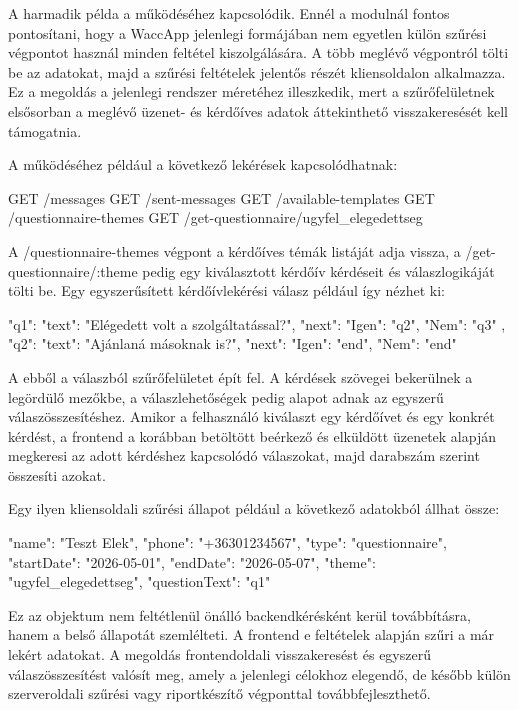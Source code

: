 A harmadik példa a  működéséhez kapcsolódik. Ennél a modulnál fontos pontosítani, hogy a WaccApp jelenlegi formájában nem egyetlen külön szűrési végpontot használ minden feltétel kiszolgálására. A  több meglévő végpontról tölti be az adatokat, majd a szűrési feltételek jelentős részét kliensoldalon alkalmazza. Ez a megoldás a jelenlegi rendszer méretéhez illeszkedik, mert a szűrőfelületnek elsősorban a meglévő üzenet- és kérdőíves adatok áttekinthető visszakeresését kell támogatnia.

A  működéséhez például a következő lekérések kapcsolódhatnak:

\begin{CodeBlock}
GET /messages
GET /sent-messages
GET /available-templates
GET /questionnaire-themes
GET /get-questionnaire/ugyfel_elegedettseg
\end{CodeBlock}

A /questionnaire-themes végpont a kérdőíves témák listáját adja vissza, a /get-questionnaire/:theme pedig egy kiválasztott kérdőív kérdéseit és válaszlogikáját tölti be. Egy egyszerűsített kérdőívlekérési válasz például így nézhet ki:

\begin{CodeBlock}
{
  "q1": {
    "text": "Elégedett volt a szolgáltatással?",
    "next": {
      "Igen": "q2",
      "Nem": "q3"
    }
  },
  "q2": {
    "text": "Ajánlaná másoknak is?",
    "next": {
      "Igen": "end",
      "Nem": "end"
    }
  }
}
\end{CodeBlock}

A  ebből a válaszból szűrőfelületet épít fel. A kérdések szövegei bekerülnek a legördülő mezőkbe, a válaszlehetőségek pedig alapot adnak az egyszerű válaszösszesítéshez. Amikor a felhasználó kiválaszt egy kérdőívet és egy konkrét kérdést, a frontend a korábban betöltött beérkező és elküldött üzenetek alapján megkeresi az adott kérdéshez kapcsolódó válaszokat, majd darabszám szerint összesíti azokat.

Egy ilyen kliensoldali szűrési állapot például a következő adatokból állhat össze:

\begin{CodeBlock}
{
  "name": "Teszt Elek",
  "phone": "+36301234567",
  "type": "questionnaire",
  "startDate": "2026-05-01",
  "endDate": "2026-05-07",
  "theme": "ugyfel_elegedettseg",
  "questionText": "q1"
}
\end{CodeBlock}

Ez az objektum nem feltétlenül önálló backendkérésként kerül továbbításra, hanem a  belső állapotát szemlélteti. A frontend e feltételek alapján szűri a már lekért adatokat. A megoldás frontendoldali visszakeresést és egyszerű válaszösszesítést valósít meg, amely a jelenlegi célokhoz elegendő, de később külön szerveroldali szűrési vagy riportkészítő végponttal továbbfejleszthető.


